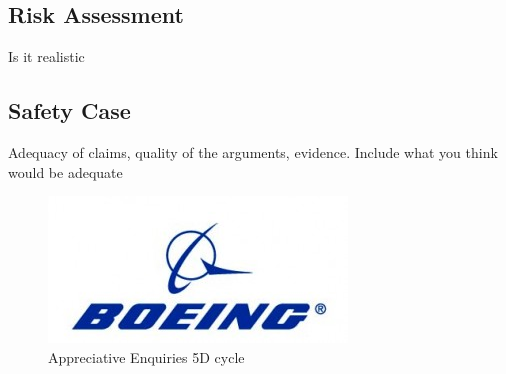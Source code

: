 \documentclass[12pt,a4paper]{article}
\begin{document}
\subsection{Risk Assessment}
Is it realistic
\subsection{Safety Case}
Adequacy of claims, quality of the arguments, evidence. Include what you think would be adequate


\begin{figure}[H]
\centering
\includegraphics[scale=0.5]{Imgs/boeinglogo}
\caption[5Ds of Appreciative Enquiry]{Appreciative Enquiries 5D cycle\protect\cite{kular2008employee}}
\end{figure}
\end{document}
